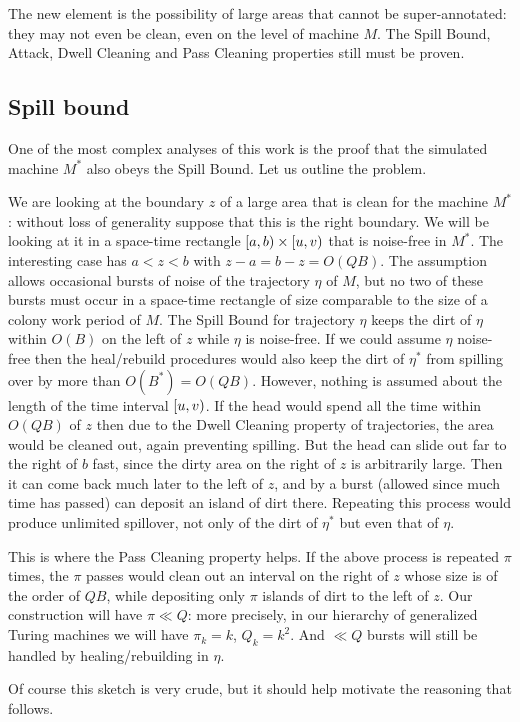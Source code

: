 \documentclass[12pt]{memoir}
\def\B{B}
\begin{document}
The new element is the possibility of large areas that cannot be super-annotated: they
may not even be clean, even on the level of machine \( M \).
The Spill Bound, Attack, Dwell Cleaning and Pass Cleaning properties still must be proven.

\subsection{Spill bound}

One of the most complex analyses of this work is the proof that 
the simulated machine \( M^{*} \) also obeys the Spill Bound.
Let us outline the problem.

We are looking at the boundary \( z \) of a large area that is clean for the
machine \( M^{*} \): without loss of generality suppose that this is the right boundary.
We will be looking at it in a space-time rectangle \( \left[a,b\right)\times\left[u,v\right) \)
that is noise-free in \( M^{*} \).
The interesting case has \( a<z<b \) with \( z-a=b-z=O(Q\B) \).
The assumption allows occasional bursts of noise of the trajectory \( \eta \) of \( M \),
but no two of these bursts must occur in a space-time rectangle of size comparable to
the size of a colony work period of \( M \).
The Spill Bound for trajectory \( \eta \) keeps the dirt of \( \eta \) within
\( O(\B) \) on the left of \( z \) while \( \eta \) is noise-free.
If we could assume \( \eta \) noise-free then the heal/rebuild procedures would also keep
the dirt of \( \eta^{*} \) from spilling over by more than \( O(\B^{*})=O(Q\B) \).
However, nothing is assumed about the length of the time interval \( \left[u,v\right) \).
If the head would spend all the time within \( O(Q\B) \) of \( z \) then due to 
the Dwell Cleaning property of trajectories,  the area would be cleaned out, again
preventing spilling.
But the head can slide out far to the right of \( b \) fast, since
the dirty area on the right of \( z \) is arbitrarily large.
Then it can come back much later to the left of \( z \), and by
a burst (allowed since much time has passed)
can deposit an island of dirt there.
Repeating this process would produce unlimited spillover, not only 
of the dirt of \( \eta^{*} \) but even that of \( \eta \).

This is where the Pass Cleaning property helps.
If the above process is repeated \( \pi \) times, the \( \pi \) passes
would clean out an interval on the
right of \( z \) whose size is of the order of \( Q\B \),
while depositing only \( \pi \) islands of dirt to the left of \( z \).
Our construction will have \( \pi\ll Q \): more precisely, in our hierarchy
of generalized Turing machines we will have \( \pi_{k}=k \), \( Q_{k}=k^{2} \). %
And \( \ll Q \) bursts will still be handled by healing/rebuilding in \( \eta \).

Of course this sketch is very crude, but it should help motivate the reasoning that
follows.





\end{document}
